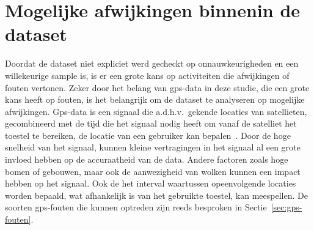 \section{Mogelijke afwijkingen binnenin de dataset}
Doordat de dataset niet expliciet werd gecheckt op onnauwkeurigheden en een
willekeurige sample is, is er een grote kans op activiteiten die afwijkingen of
fouten vertonen. Zeker door het belang van \ac{gps}-data in deze studie, die
een grote kans heeft op fouten, is het belangrijk om de dataset te analyseren
op mogelijke afwijkingen. Gps-data is een signaal die a.d.h.v.\ gekende
locaties van satellieten, gecombineerd met de tijd die het signaal nodig heeft
om vanaf de satelliet het toestel te bereiken, de locatie van een gebruiker kan
bepalen~\cite{BadGPSDa19:online}. Door de hoge snelheid van het signaal, kunnen
kleine vertragingen in het signaal al een grote invloed hebben op de
accuraatheid van de data. Andere factoren zoals hoge bomen of gebouwen, maar
ook de aanwezigheid van wolken kunnen een impact hebben op het signaal. Ook de
het interval waartussen opeenvolgende locaties worden bepaald, wat afhankelijk
is van het gebruikte toestel, kan meespellen. De soorten \ac{gps}-fouten die
kunnen optreden zijn reeds besproken in Sectie~\ref{sec:gps-fouten}.

